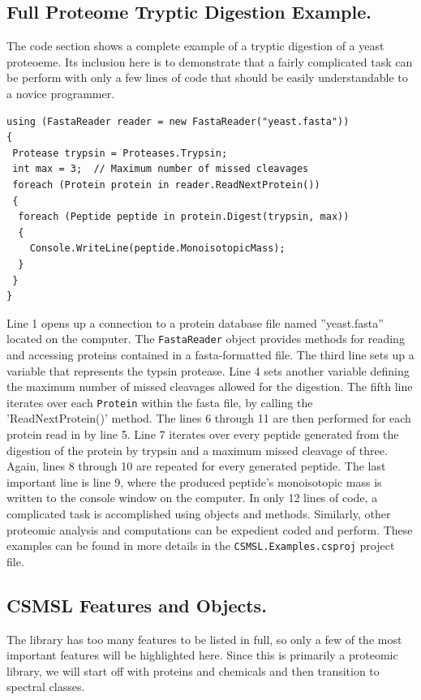 \subsection*{Full Proteome Tryptic Digestion Example.} The code section shows a complete example of a tryptic digestion of a yeast proteoeme. Its inclusion here is to demonstrate that a fairly complicated task can be perform with only a few lines of code that should be easily understandable to a novice programmer.
\begin{lstlisting}
using (FastaReader reader = new FastaReader("yeast.fasta"))
{
 Protease trypsin = Proteases.Trypsin;
 int max = 3;  // Maximum number of missed cleavages
 foreach (Protein protein in reader.ReadNextProtein())
 {
  foreach (Peptide peptide in protein.Digest(trypsin, max))
  {
    Console.WriteLine(peptide.MonoisotopicMass);  
  }
 }
}       
\end{lstlisting}
Line 1 opens up a connection to a protein database file named ''yeast.fasta'' located on the computer. The \texttt{FastaReader} object provides methods for reading and accessing proteins contained in a fasta-formatted file. The third line sets up a variable that represents the typsin protease. Line 4 sets another variable defining the maximum number of missed cleavages allowed for the digestion. The fifth line iterates over each \texttt{Protein} within the fasta file, by calling the 'ReadNextProtein()' method. The lines 6 through 11 are then performed for each protein read in by line 5. Line 7 iterates over every peptide generated from the digestion of the protein by trypsin and a maximum missed cleavage of three. Again, lines 8 through 10 are repeated for every generated peptide. The last important line is line 9, where the produced peptide's monoisotopic mass is written to the console window on the computer. In only 12 lines of code, a complicated task is accomplished using \csmsl{} objects and methods. Similarly, other proteomic analysis and computations can be expedient coded and perform. These examples can be found in more details in the \texttt{CSMSL.Examples.csproj} project file.

\subsection*{CSMSL Features and Objects.}
The \csmsl{} library has too many features to be listed in full, so only a few of the most important features will be highlighted here. Since this is primarily a proteomic library, we will start off with proteins and chemicals and then transition to spectral classes. 

